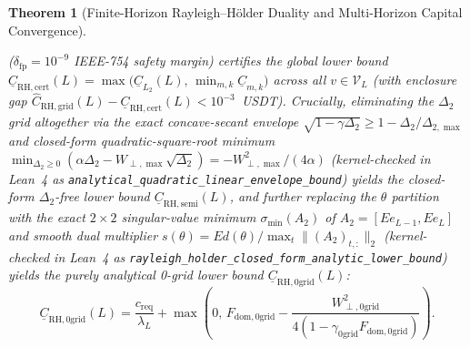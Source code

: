 \documentclass[12pt]{article}
\newtheorem{theorem}{Theorem}[section]
\theoremstyle{definition}
\theoremstyle{remark}
\begin{document}
\begin{theorem}[Finite-Horizon Rayleigh--H\"older Duality and Multi-Horizon Capital Convergence]
\begin{enumerate}
($\delta_{\mathrm{fp}} = 10^{-9}$ IEEE-754 safety margin) certifies the global lower bound $\underline{C}_{\mathrm{RH,cert}}(L) = \max\!\bigl(\underline{C}_{L_2}(L),\, \min_{m,k} \underline{C}_{m,k}\bigr)$ across all $v \in \mathcal{V}_L$ (with enclosure gap $\hat{C}_{\mathrm{RH,grid}}(L) - \underline{C}_{\mathrm{RH,cert}}(L) < 10^{-3}$~USDT). Crucially, eliminating the $\Delta_2$ grid altogether via the exact concave-secant envelope $\sqrt{1 - \gamma\Delta_2} \ge 1 - \Delta_2/\Delta_{2,\max}$ and closed-form quadratic-square-root minimum $\min_{\Delta_2 \ge 0}(\alpha \Delta_2 - W_{\perp,\max}\sqrt{\Delta_2}) = -W_{\perp,\max}^2/(4\alpha)$ (kernel-checked in Lean~4 as \nolinkurl{analytical_quadratic_linear_envelope_bound}) yields the closed-form $\Delta_2$-free lower bound $\underline{C}_{\mathrm{RH,semi}}(L)$, and further replacing the $\theta$ partition with the exact $2\times 2$ singular-value minimum $\sigma_{\min}(A_2)$ of $A_2 = [E e_{L-1}, E e_L]$ and smooth dual multiplier $s(\theta) = E d(\theta)/\max_t \|(A_2)_{t,:}\|_2$ (kernel-checked in Lean~4 as \nolinkurl{rayleigh_holder_closed_form_analytic_lower_bound}) yields the purely analytical 0-grid lower bound $\underline{C}_{\mathrm{RH,0grid}}(L)$:
\begin{equation}
\underline{C}_{\mathrm{RH,0grid}}(L) = \frac{c_{\mathrm{req}}}{\lambda_L} + \max\!\left(0,\, F_{\mathrm{dom,0grid}} - \frac{W_{\perp,\mathrm{0grid}}^2}{4(1 - \gamma_{\mathrm{0grid}}F_{\mathrm{dom,0grid}})}\right).
\end{equation}

\end{enumerate}
\end{theorem}
\end{document}
